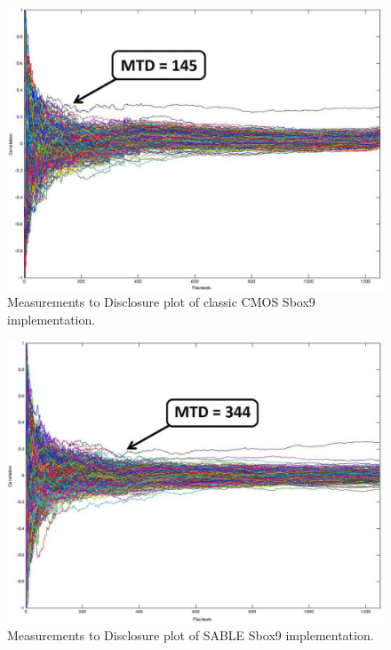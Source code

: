 \documentclass[conference, 12pt]{IEEEtran}
\newcommand{\x}{1}						%
\begin{document}
			\begin{figure}[tbp]
				\centering
				\includegraphics[width=\x\linewidth]{ReportFiles/Classic_MTD.png}
				\caption{Measurements to Disclosure plot of classic CMOS Sbox9 implementation.\cite{b5}}
				\label{Classic_MTD}
			\end{figure}
			\begin{figure}[tbp]
				\centering
				\includegraphics[width=\x\linewidth]{ReportFiles/SABL_MTD.png}
				\caption{Measurements to Disclosure plot of SABLE Sbox9 implementation.\cite{b5}}
				\label{SABL_MTD}
			\end{figure}
\end{document}
